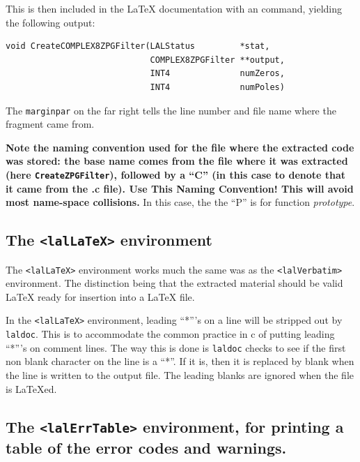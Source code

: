 \documentclass[oneside]{book}
\begin{document}
This is then included in the {\LaTeX} documentation with an
\verb@@ command, yielding the following
output:

\vspace{-1ex}
\mbox{}
\vspace{-3ex}
\begin{verbatim}
void CreateCOMPLEX8ZPGFilter(LALStatus         *stat,
                             COMPLEX8ZPGFilter **output,
                             INT4              numZeros,
                             INT4              numPoles)
\end{verbatim}

The {\tt marginpar} on the far right tells the line number and file
name where the fragment came from.

{\bf Note the naming convention used for the file where the extracted
code was stored: the base name comes from the file where it was
extracted (here {\texttt {CreateZPGFilter}}), followed by a ``C'' (in
this case to denote that it came from the .c file).  {\Large {Use This
Naming Convention!}} This will avoid most name-space collisions.}  In
this case,  the the ``P'' is for function {\it prototype}.


\subsection{The {\texttt {<lalLaTeX>} } environment }

The {\texttt {<lalLaTeX>} } environment works much the same
was as the {\texttt {<lalVerbatim>} } environment. The distinction
being that the extracted material should be valid {\LaTeX} ready
for insertion into a {\LaTeX} file. 

In the {\texttt {<lalLaTeX>}} environment, leading ``*'''s on a line 
will be stripped out by {\tt laldoc}. This is to accommodate the common
practice in c of putting leading ``*'''s on comment lines.  The way
this is done is {\tt laldoc} checks to see if the first non blank
character on the line is a ``*''. If it is, then it is replaced by
blank when the line is written to the output file. The leading
blanks are ignored when the file is {\LaTeX}ed.


\subsection{The {\texttt {<lalErrTable>} } environment, for printing
a table of the error codes and warnings.}
\end{document}
